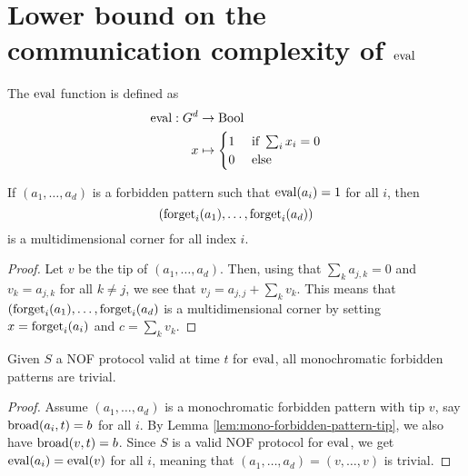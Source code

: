 \chapter{Lower bound on the communication complexity of $\operatorname{eval}$}

\begin{definition}
  \label{def:eval}
  \leanok

  The $\operatorname{eval}$ function is defined as
  \begin{align}
      \operatorname{eval} : G^d & \to \operatorname{Bool} \\
      x & \mapsto \begin{cases}
      1 & \text{ if } \sum_i x_i = 0 \\
      0 & \text{ else}
    \end{cases}
  \end{align}
\end{definition}

\begin{lemma}
  \label{lem:forbidden-pattern-project-multicorner}
  \leanok

  If $(a_1, \dots, a_d)$ is a forbidden pattern such that $\operatorname{eval}(a_i) = 1$ for all $i$, then
  $$(\operatorname{forget}_i(a_1), \dots, \operatorname{forget}_i(a_d))$$
  is a multidimensional corner for all index $i$.
\end{lemma}
\begin{proof}

  Let $v$ be the tip of $(a_1, \dots, a_d)$. Then, using that $\sum_k a_{j, k} = 0$ and $v_k = a_{j, k}$ for all $k \ne j$, we see that $v_j = a_{j, j} + \sum_k v_k$. This means that $(\operatorname{forget}_i(a_1), \dots, \operatorname{forget}_i(a_d)$ is a multidimensional corner by setting $x = \operatorname{forget}_i(a_i)$ and $c = \sum_k v_k$.
\end{proof}

\begin{lemma}
  \label{lem:mono-forbidden-pattern-trivial}
  \leanok

  Given $S$ a NOF protocol valid at time $t$ for $\operatorname{eval}$, all monochromatic forbidden patterns are trivial.
\end{lemma}
\begin{proof}
  \leanok

  Assume $(a_1, \dots, a_d)$ is a monochromatic forbidden pattern with tip $v$, say $\operatorname{broad}(a_i, t) = b$ for all $i$. By Lemma \ref{lem:mono-forbidden-pattern-tip}, we also have $\operatorname{broad}(v, t) = b$. Since $S$ is a valid NOF protocol for $\operatorname{eval}$, we get $\operatorname{eval}(a_i) = \operatorname{eval}(v)$ for all $i$, meaning that $(a_1, \dots, a_d) = (v, \dots, v)$ is trivial.
\end{proof}
